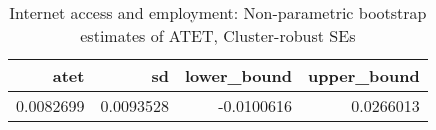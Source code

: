 \begin{table}[!h]
\centering
\caption{\label{tab:tab:np_atet_clustered}Internet access and employment: Non-parametric bootstrap estimates of ATET, Cluster-robust SEs}
\centering
\begin{tabular}[t]{rrrr}
\toprule
atet & sd & lower\_bound & upper\_bound\\
\midrule
0.0082699 & 0.0093528 & -0.0100616 & 0.0266013\\
\bottomrule
\end{tabular}
\end{table}

